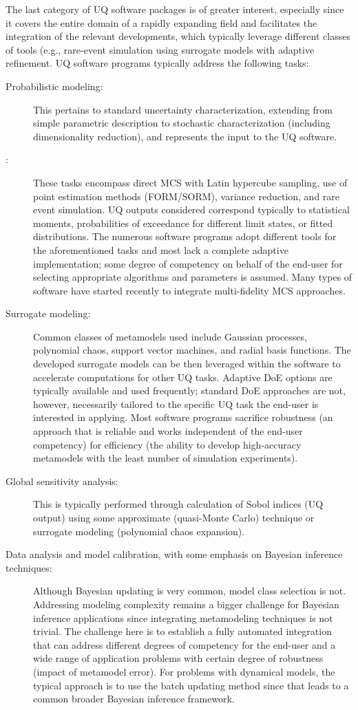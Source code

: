 The last category of UQ software packages is of greater interest, especially since it covers the entire domain of a rapidly expanding field and facilitates the integration of the relevant developments, which typically leverage different classes of tools (e.g., rare-event simulation using surrogate models with adaptive refinement. UQ software programs typically address the following tasks:

\begin{description}
    \item[Probabilistic modeling:]{This pertains to standard uncertainty characterization, extending from simple parametric description to stochastic characterization (including dimensionality reduction), and represents the input to the UQ software.}
    \item[:]{These tasks encompass direct MCS with Latin hypercube sampling, use of point estimation methods (FORM/SORM),  variance reduction, and rare event simulation. UQ outputs considered correspond typically to statistical moments, probabilities of exceedance for different limit states, or fitted distributions. The numerous software programs adopt different tools for the aforementioned tasks and most lack a complete adaptive implementation; some degree of competency on behalf of the end-user for selecting appropriate algorithms and parameters is assumed. Many types of software have started recently to integrate multi-fidelity MCS approaches.}
    \item[Surrogate modeling:]{Common classes of metamodels used include Gaussian processes, polynomial chaos, support vector machines, and radial basis functions. The developed surrogate models can be then leveraged within the software to accelerate computations for other UQ tasks. Adaptive DoE options are typically available and used frequently; standard DoE approaches are not, however, necessarily tailored to the specific UQ task the end-user is interested in applying. Most software programs sacrifice robustness (an approach that is reliable and works independent of the end-user competency) for efficiency (the ability to develop high-accuracy metamodels with the least number of simulation experiments).}
    \item[Global sensitivity analysis:]{This is typically performed through calculation of Sobol indices (UQ output) using some approximate (quasi-Monte Carlo) technique or surrogate modeling (polynomial chaos expansion).}
    \item[Data analysis and model calibration, with some emphasis on Bayesian inference techniques:]{Although Bayesian updating is very common, model class selection is not. Addressing modeling complexity remains a bigger challenge for Bayesian inference applications since integrating metamodeling techniques is not trivial. The challenge here is to establish a fully automated integration that can address different degrees of competency for the end-user and a wide range of application problems with certain degree of robustness (impact of metamodel error). For problems with dynamical models, the typical approach is to use the batch updating method since that leads to a common broader Bayesian inference framework.}

\end{description}
